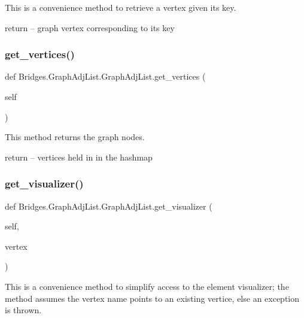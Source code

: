 This is a convenience method to retrieve a vertex given its key. 

return -- graph vertex corresponding to its key \mbox{\label{class_bridges_1_1_graph_adj_list_1_1_graph_adj_list_aef8bfd0d25e35648de441ad3a0fe3abb}} 
\subsubsection{\texorpdfstring{get\+\_\+vertices()}{get\_vertices()}}
{\footnotesize\ttfamily def Bridges.\+Graph\+Adj\+List.\+Graph\+Adj\+List.\+get\+\_\+vertices (\begin{DoxyParamCaption}\item[{}]{self }\end{DoxyParamCaption})}



This method returns the graph nodes. 

return -- vertices held in in the hashmap \mbox{\label{class_bridges_1_1_graph_adj_list_1_1_graph_adj_list_a2fcf16bbc27fc0403049a0258ce02cbe}} 
\subsubsection{\texorpdfstring{get\+\_\+visualizer()}{get\_visualizer()}}
{\footnotesize\ttfamily def Bridges.\+Graph\+Adj\+List.\+Graph\+Adj\+List.\+get\+\_\+visualizer (\begin{DoxyParamCaption}\item[{}]{self,  }\item[{}]{vertex }\end{DoxyParamCaption})}



This is a convenience method to simplify access to the element visualizer; the method assumes the vertex name points to an existing vertice, else an exception is thrown. 



